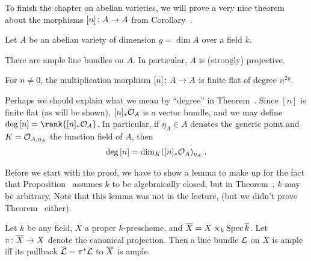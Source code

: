 \documentclass[a4paper,parskip=half,numbers=enddot, DIV=12]{scrreprt}
\begin{document}
	To finish the chapter on abelian varieties, we will prove a very nice theorem about the morphisms $[n]\colon A\morphism A$ from Corollary~.
\begin{thm}
	Let $A$ be an abelian variety of dimension $g=\dim A$ over a field $k$.
	\begin{alphanumerate}
		\item There are ample line bundles on $A$. In particular, $A$ is (strongly) projective.
		\item For $n\neq 0$, the multiplication morphism $[n]\colon A\morphism A$ is finite flat of degree $n^{2g}$.
	\end{alphanumerate}
\end{thm}
\begin{rem}
	Perhaps we should explain what we mean by ``degree'' in Theorem~. Since $[n]$ is finite flat (as will be shown), $[n]_*\mathcal{O}_A$ is a vector bundle, and we may define $\deg{[n]}=\rank {[n]_*\Oo_A}$. In particular, if $\eta_A\in A$ denotes the generic point and $K=\mathcal{O}_{A,\eta_A}$ the function field of $A$, then 
	\begin{align*}
		\deg{[n]}=\dim_K([n]_*\mathcal{O}_A)_{\eta_A}\;.
	\end{align*}
\end{rem}
Before we start with the proof, we have to show a lemma to make up for the fact that Proposition~ assumes $k$ to be algebraically closed, but in Theorem~, $k$ may be arbitrary. Note that this lemma was not in the lecture,  (but we didn't prove Theorem~ either).
\begin{lem}
	Let $k$ be any field, $X$ a proper $k$-prescheme, and $\overline{X}=X\times_k\operatorname{Spec} \overline{k}$. Let $\pi\colon \ov{X}\morphism X$ denote the canonical projection. Then a line bundle $\mathcal{L}$ on $X$ is ample iff its pullback $\overline{\mathcal{L}}=\pi^*\mathcal{L}$ to $\overline{X}$ is ample.
\end{lem}
\end{document}

